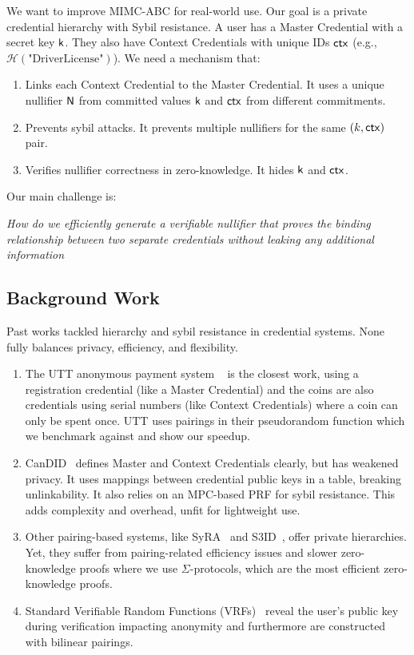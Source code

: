 We want to improve MIMC-ABC for real-world use. Our goal is a private credential hierarchy with Sybil resistance. A user has a Master Credential with a secret key $\mathsf{k}$. They also have Context Credentials with unique IDs $\mathsf{ctx}$ (e.g., $\mathcal{H}(\text{"DriverLicense"})$). We need a mechanism that:
\begin{enumerate}
    \item Links each Context Credential to the Master Credential. It uses a unique nullifier $\mathsf{N}$ from committed values $\mathsf{k}$ and $\mathsf{ctx}$ from different commitments.
    \item Prevents sybil attacks. It prevents multiple nullifiers for the same $(k, \mathsf{ctx})$ pair.
    \item Verifies nullifier correctness in zero-knowledge. It hides $\mathsf{k}$ and $\mathsf{ctx}$.
\end{enumerate}


Our main challenge is:
\begin{center}
\emph{How do we efficiently generate a verifiable nullifier that proves the binding relationship between two separate credentials without leaking any additional information}
\end{center}


\subsection{Background Work}

Past works tackled hierarchy and sybil resistance in credential systems. None fully balances privacy, efficiency, and flexibility. 
\begin{enumerate}
    \item The UTT anonymous payment system ~\cite{tomescu2022utt} is the closest work, using a registration credential (like a Master Credential) and the coins are also credentials using serial numbers (like Context Credentials) where a coin can only be spent once. UTT uses pairings in their pseudorandom function which we benchmark against and show our speedup.

    \item CanDID~\cite{maram2021candid} defines Master and Context Credentials clearly, but has weakened privacy. It uses mappings between credential public keys in a table, breaking unlinkability. It also relies on an MPC-based PRF for sybil resistance. This adds complexity and overhead, unfit for lightweight use.

    \item Other pairing-based systems, like SyRA~\cite{crites_syra_2024} and S3ID~\cite{rabaninejad_attribute-based_2024}, offer private hierarchies. Yet, they suffer from pairing-related efficiency issues and slower zero-knowledge proofs where we use $\Sigma$-protocols, which are the most efficient zero-knowledge proofs.

    \item Standard Verifiable Random Functions  (VRFs)~\cite{hutchison_verifiable_2005} reveal the user’s public key during verification impacting anonymity and furthermore are constructed with bilinear pairings.

\end{enumerate}

